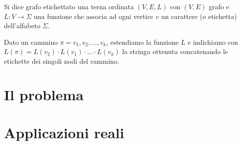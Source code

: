 \begin{definizione}\label{def:grafoetichettato}
	Si dice grafo etichettato una terna ordinata $(V,E,L)$ con $(V,E)$ grafo e $L : V \rightarrow \Sigma$ una funzione che associa ad ogni vertice $v$ un carattere (o etichetta) dell'alfabeto $\Sigma$.   
\end{definizione}

	Dato un cammino $\pi = v_{1}, v_{2}, \ldots, v_{k}$,
	estendiamo la funzione $L$ e indichiamo con $L(\pi) = L(v_{2}) \cdot L(v_{1}) \cdot \ldots \cdot L(v_{k})$ la stringa ottenuta concatenando le etichette dei singoli nodi del cammino.
	

\section{Il problema}

\section{Applicazioni reali}

